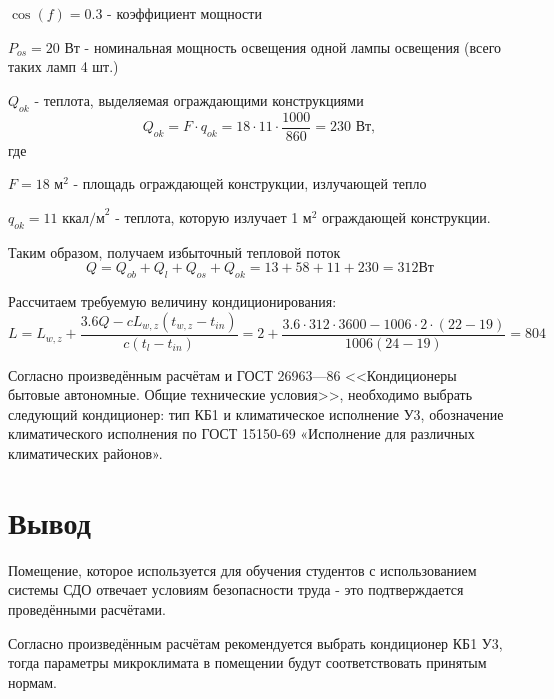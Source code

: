 $\cos(f) = 0.3$ - коэффициент мощности

$P_{os} = 20 \mbox{ Вт}$ -  номинальная мощность освещения одной лампы освещения
(всего таких ламп 4 шт.)

$Q_{ok}$ - теплота, выделяемая ограждающими конструкциями
$$
Q_{ok} = F\cdot q_{ok} = 18 \cdot 11 \cdot \frac{1000}{860} = 230 \mbox{ Вт},
$$
где

$F = 18 \mbox{ м}^2$  - площадь ограждающей конструкции, излучающей тепло

$q_{ok} = 11 \mbox{ ккал/м}^2$ -  теплота, которую излучает 1 м$^2$ ограждающей кон\-струкции.

Таким образом, получаем избыточный тепловой поток
$$
Q = Q_{ob} + Q_{l} + Q_{os} + Q_{ok}= 13 + 58 + 11 + 230 = 312 \mbox{Вт}
$$

Рассчитаем требуемую величину кондиционирования:
{\small
$$
L = L_{w,z} + \frac{3.6Q - cL_{w,z}(t_{w,z} - t_{in})}{c(t_{l}-t_{in})} = 2 + \frac{3.6\cdot312\cdot3600 - 1006\cdot2\cdot(22-19)}{1006(24-19)} = 804
$$
}

Согласно произведённым расчётам и ГОСТ 26963—86 <<Кондиционеры бытовые авто\-номные. Общие технические условия>>, необходимо выбрать сле\-дующий кондиционер: тип КБ1 и климатическое исполнение У3, обозначение климатического исполнения по ГОСТ 15150-69 «Исполнение для различных климатических районов».

\section{Вывод}

Помещение, которое используется для обучения студентов с использо\-ванием системы СДО отвечает условиям безопасности труда - это подтвер\-ждается проведёнными расчётами. 

Согласно произведённым расчётам рекомендуется выбрать кондиционер КБ1 У3, тогда параметры микроклимата в помещении будут соответствовать принятым нормам.


 
